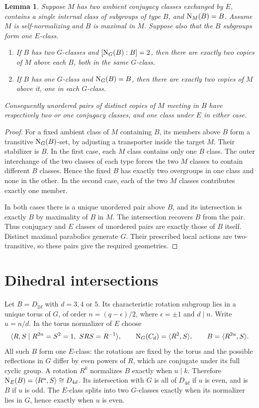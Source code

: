 \documentclass[11pt]{article}
\newtheorem{lemma}{Lemma}\newtheorem{theorem}[lemma]{Theorem}
\begin{document}
\begin{lemma}\label{pair}
Suppose $M$ has two ambient conjugacy classes exchanged by $E$,
contains a single internal class of subgroups of type $B$, and
$\operatorname{N}_M(B)=B$. Assume $M$ is self-normalizing and $B$ is maximal
in $M$. Suppose also that the $B$ subgroups form one $E$-class.
\begin{enumerate}
\item If $B$ has two $G$-classes and $[\operatorname{N}_G(B):B]=2$, then
there are exactly two copies of $M$ above each $B$, both in the
same $G$-class.
\item If $B$ has one $G$-class and $\operatorname{N}_G(B)=B$, then there
are exactly two copies of $M$ above it, one in each $G$-class.
\end{enumerate}
Consequently unordered pairs of distinct copies of $M$ meeting in
$B$ have respectively two or one conjugacy classes, and one class
under $E$ in either case.
\end{lemma}
\begin{proof}
For a fixed ambient class of $M$ containing $B$, its members above
$B$ form a transitive $\operatorname{N}_G(B)$-set, by adjusting a transporter
inside the target $M$. Their stabilizer is $B$. In the first case,
each $M$ class contains only one $B$ class. The outer interchange
of the two classes of each type forces the two $M$ classes to
contain different $B$ classes. Hence the fixed $B$ has exactly two
overgroups in one class and none in the other. In the second case,
each of the two $M$ classes contributes exactly one member.

In both cases there is a unique unordered pair above $B$, and its
intersection is exactly $B$ by maximality of $B$ in $M$. The
intersection recovers $B$ from the pair. Thus conjugacy and $E$
classes of unordered pairs are exactly those of $B$ itself.
Distinct maximal parabolics generate $G$. Their prescribed local
actions are two-transitive, so these pairs give the required geometries.
\end{proof}

\section{Dihedral intersections}
Let $B=D_{2d}$ with $d=3,4$ or $5$. Its characteristic rotation
subgroup lies in a unique torus of $G$, of order
$n=(q-\epsilon)/2$, where $\epsilon=\pm1$ and $d\mid n$.
Write $u=n/d$. In the torus normalizer of $E$ choose
\[
 \langle R,S\mid R^{2n}=S^2=1,\ SRS=R^{-1}\rangle,
 \qquad \N_G(C_d)=\langle R^2,S\rangle,
 \qquad B=\langle R^{2u},S\rangle.
\]
All such $B$ form one $E$-class: the rotations are fixed by the
torus and the possible reflections in $G$ differ by even powers
of $R$, which are conjugate under its full cyclic group.
A rotation $R^k$ normalizes $B$ exactly when $u\mid k$.
Therefore $\operatorname{N}_E(B)=\langle R^u,S\rangle\cong D_{4d}$.
Its intersection with $G$ is all of $D_{4d}$ if $u$ is even,
and is $B$ if $u$ is odd. The $E$-class splits into two $G$-classes
exactly when its normalizer lies in $G$, hence exactly when $u$ is even.
\end{document}
